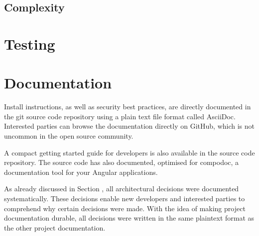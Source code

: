 \subsection{Complexity}


\section{Testing}


\section{Documentation}

Install instructions, as well as security best practices, are directly documented in the git source code repository using a plain text file format called AsciiDoc.
Interested parties can browse the documentation directly on GitHub, which is not uncommon in the open source community.

A compact getting started guide for developers is also available in the source code repository.
The source code has also documented, optimised for compodoc, a documentation tool for your Angular applications.

As already discussed in Section , all architectural decisions were documented systematically.
These decisions enable new developers and interested parties to comprehend why certain decisions were made.
With the idea of making project documentation durable, all decisions were written in the same plaintext format as the other project documentation.
